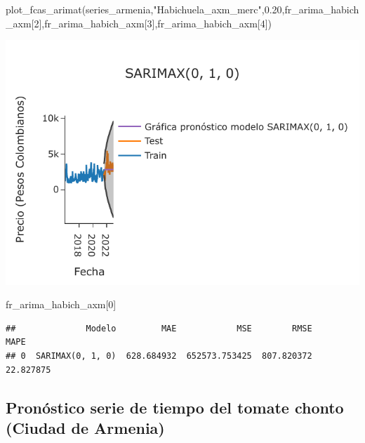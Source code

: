 \documentclass[
]{book}
\newenvironment{Shaded}{\begin{snugshade}}{\end{snugshade}}
\newcommand{\DecValTok}[1]{\textcolor[rgb]{0.00,0.00,0.81}{#1}}
\newcommand{\FloatTok}[1]{\textcolor[rgb]{0.00,0.00,0.81}{#1}}
\newcommand{\NormalTok}[1]{#1}
\newcommand{\StringTok}[1]{\textcolor[rgb]{0.31,0.60,0.02}{#1}}
\begin{document}
\begin{Shaded}
\begin{Highlighting}[]

\NormalTok{plot\_fcas\_arimat(series\_armenia,}\StringTok{"Habichuela\_axm\_merc"}\NormalTok{,}\FloatTok{0.20}\NormalTok{,fr\_arima\_habich\_axm[}\DecValTok{2}\NormalTok{],fr\_arima\_habich\_axm[}\DecValTok{3}\NormalTok{],fr\_arima\_habich\_axm[}\DecValTok{4}\NormalTok{])}
\end{Highlighting}
\end{Shaded}

\includegraphics{bookdown-demo_files/figure-latex/unnamed-chunk-155-145.pdf}

\begin{Shaded}
\begin{Highlighting}[]

\NormalTok{fr\_arima\_habich\_axm[}\DecValTok{0}\NormalTok{]}
\end{Highlighting}
\end{Shaded}

\begin{verbatim}
##              Modelo         MAE            MSE        RMSE       MAPE
## 0  SARIMAX(0, 1, 0)  628.684932  652573.753425  807.820372  22.827875
\end{verbatim}

\hypertarget{pronuxf3stico-serie-de-tiempo-del-tomate-chonto-ciudad-de-armenia-1}{%
\subsection{Pronóstico serie de tiempo del tomate chonto (Ciudad de Armenia)}\label{pronuxf3stico-serie-de-tiempo-del-tomate-chonto-ciudad-de-armenia-1}}
\end{document}
